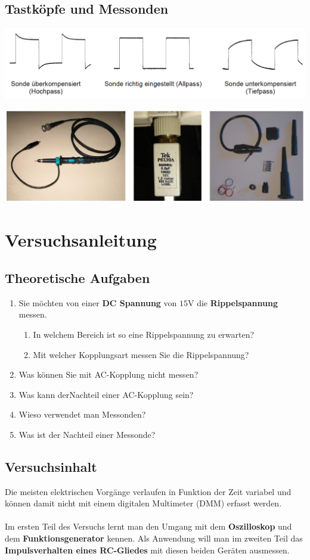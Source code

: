 \subsection{Tastköpfe und Messonden}
\begin{center}
\includegraphics[scale=0.4]{../img/IV/IVb}
\end{center}
\begin{center}
\includegraphics[scale=0.4]{../img/IV/IVc}
\end{center}
\section{Versuchsanleitung}
\subsection{Theoretische Aufgaben}
\begin{enumerate}[$a)$]
\item Sie möchten von einer \textbf{DC Spannung} von $15\text{V}$ die \textbf{Rippelspannung} messen.
\begin{enumerate}[$\bullet$]
\item In welchem Bereich ist so eine Rippelspannung zu erwarten?
\item Mit welcher Kopplungsart messen Sie die Rippelspannung?
\end{enumerate}
\item Was können Sie mit AC-Kopplung nicht messen?
\item Was kann derNachteil einer AC-Kopplung sein?
\item Wieso verwendet man Messonden?
\item Was ist der Nachteil einer Messonde?
\end{enumerate}
\subsection{Versuchsinhalt}
Die meisten elektrischen Vorgänge verlaufen in Funktion der Zeit variabel und können damit nicht mit einem digitalen Multimeter (DMM) erfasst werden.
\\\\
Im ersten Teil des Versuchs lernt man den Umgang mit dem \textbf{Oszilloskop} und dem \textbf{Funktionsgenerator} kennen. Als Anwendung will man im zweiten Teil das \textbf{Impulsverhalten
eines RC-Gliedes} mit diesen beiden Geräten ausmessen.
